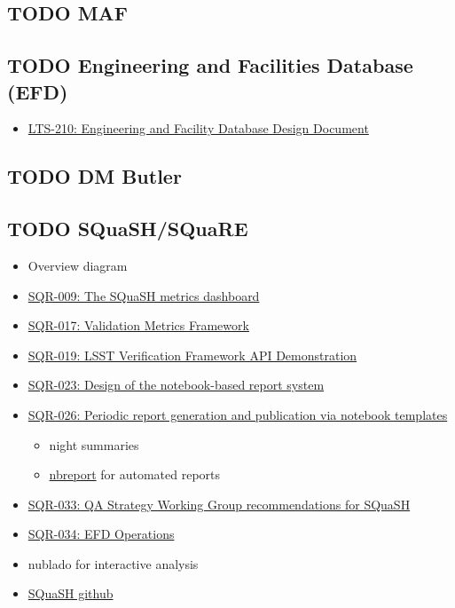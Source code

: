 \subsection{{\bfseries\sffamily TODO} MAF}
\label{sec:orgcf90451}
\subsection{{\bfseries\sffamily TODO} Engineering and Facilities Database (EFD)}
\label{sec:orga7fbc32}
\begin{itemize}
\item \href{https://ls.st/LTS-210}{LTS-210: Engineering and Facility Database Design Document}
\end{itemize}
\subsection{{\bfseries\sffamily TODO} DM Butler}
\label{sec:orge6713cf}
\subsection{{\bfseries\sffamily TODO} SQuaSH/SQuaRE}
\label{sec:orgc1acfb4}
\begin{itemize}
\item Overview diagram
\label{sec:org834f121}
\item \href{https://sqr-009.lsst.io/}{SQR-009: The SQuaSH metrics dashboard}
\label{sec:org3126d0e}
\item \href{https://sqr-017.lsst.io}{SQR-017: Validation Metrics Framework}
\label{sec:org040850c}
\item \href{https://sqr-019.lsst.io/}{SQR-019: LSST Verification Framework API Demonstration}
\label{sec:orgd9b26bd}
\item \href{https://sqr-023.lsst.io/}{SQR-023: Design of the notebook-based report system}
\label{sec:org28b5da9}
\item \href{https://sqr-026.lsst.io/}{SQR-026: Periodic report generation and publication via notebook templates}
\label{sec:org9b29048}
\begin{itemize}
\item night summaries
\label{sec:org85ac1fd}
\item \href{https://nbreport.lsst.io/}{nbreport} for automated reports
\label{sec:org9bca1dc}
\end{itemize}
\item \href{https://sqr-033.lsst.io/}{SQR-033: QA Strategy Working Group recommendations for SQuaSH}
\label{sec:org78960bd}
\item \href{https://sqr-034.lsst.io/}{SQR-034: EFD Operations}
\label{sec:org1c7db52}
\item nublado for interactive analysis
\label{sec:org1c1ee67}
\item \href{https://github.com/lsst-sqre/squash}{SQuaSH github}
\label{sec:org11b5f91}
\end{itemize}
